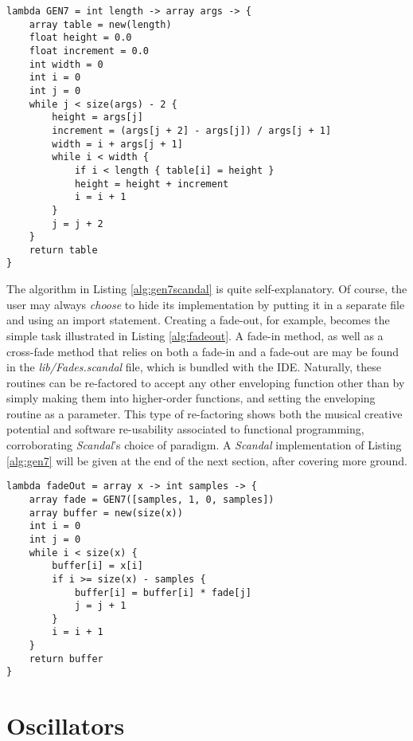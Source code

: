\begin{lstlisting}[emph={lambda,array,int,float,new,while,size,if,return},emphstyle={\textbf},caption={A \emph{Scandal} implementation of \il{GEN7}.},label={alg:gen7scandal}]
lambda GEN7 = int length -> array args -> {
	array table = new(length)
	float height = 0.0
	float increment = 0.0
	int width = 0
	int i = 0
	int j = 0
	while j < size(args) - 2 {
		height = args[j]
		increment = (args[j + 2] - args[j]) / args[j + 1]
		width = i + args[j + 1]
		while i < width {
			if i < length { table[i] = height }
			height = height + increment
			i = i + 1
		}
		j = j + 2
	}
	return table
}
\end{lstlisting}

The algorithm in Listing \ref{alg:gen7scandal} is quite self-explanatory. Of course, the user may always \emph{choose} to hide its implementation by putting it in a separate file and using an import statement. Creating a fade-out, for example, becomes the simple task illustrated in Listing \ref{alg:fadeout}. A fade-in method, as well as a cross-fade method that relies on both a fade-in and a fade-out are may be found in the \emph{lib/Fades.scandal} file, which is bundled with the IDE. Naturally, these routines can be re-factored to accept any other enveloping function other than  by simply making them into higher-order functions, and setting the enveloping routine as a parameter. This type of re-factoring shows both the musical creative potential and software re-usability associated to functional programming, corroborating \emph{Scandal}'s choice of paradigm. A \emph{Scandal} implementation of Listing \ref{alg:gen7} will be given at the end of the next section, after covering more ground.

\begin{lstlisting}[emph={lambda,array,int,new,while,size,if,return},emphstyle={\textbf},caption={Implementation of a fade-out effect.},label={alg:fadeout}]
lambda fadeOut = array x -> int samples -> {
	array fade = GEN7([samples, 1, 0, samples])
	array buffer = new(size(x))
	int i = 0
	int j = 0
	while i < size(x) {
		buffer[i] = x[i]
		if i >= size(x) - samples {
			buffer[i] = buffer[i] * fade[j]
			j = j + 1
		}
		i = i + 1
	}
	return buffer
}
\end{lstlisting}

\section{Oscillators}

